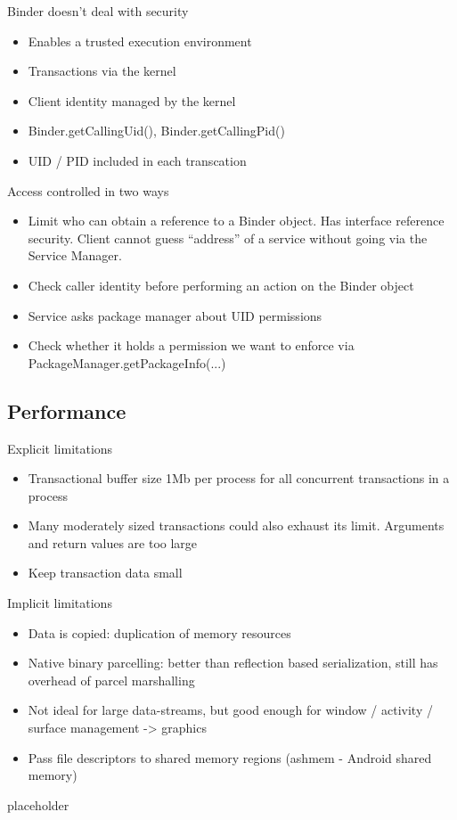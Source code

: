 \documentclass{article}
\begin{document}
\begin{flushleft}
Binder	doesn’t	deal	with	security
\begin{itemize}
  \item Enables a trusted execution environment
  \item Transactions via the kernel 
  \item Client identity managed by the kernel 
  \item Binder.getCallingUid(), Binder.getCallingPid() 
  \item UID / PID included in each transcation
\end{itemize}
Access controlled in two ways
\begin{itemize}
  \item Limit who can obtain a reference to a Binder object. Has interface reference security. Client cannot guess “address” of a service without going via the Service Manager.
  \item Check caller identity before performing an action on the Binder object 
  \item Service asks package manager about UID permissions 
  \item Check whether it holds a permission we want to enforce via PackageManager.getPackageInfo(...) 
\end{itemize}
\end{flushleft}
\newpage

\subsection{Performance}

\begin{flushleft}
Explicit limitations
\begin{itemize}
  \item Transactional buffer size 1Mb per process for all concurrent transactions in a process 
  \item Many moderately sized transactions could also exhaust its limit. Arguments and return values are too large 
  \item Keep transaction data small
\end{itemize}
Implicit limitations
\begin{itemize}
  \item Data is copied: duplication of memory resources
  \item Native binary parcelling: better than reflection based serialization, still has overhead of parcel marshalling 
  \item Not ideal for large data-streams, but good enough for window / activity / surface management -> graphics 
  \item Pass file descriptors to shared memory regions (ashmem - Android shared memory)
\end{itemize}
\end{flushleft}

\begin{description}
	\item[placeholder] \hfill \\
\end{description}
\end{document}
